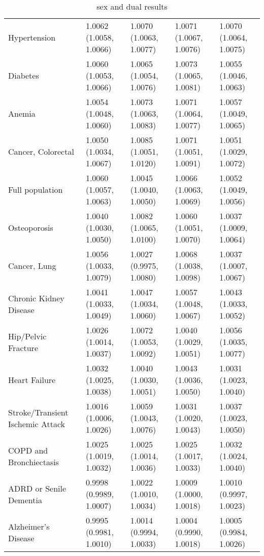 \begin{table}[ht]
\begin{tabular}{lllll}
  Hypertension & 1.0062 (1.0058, 1.0066) & 1.0070 (1.0063, 1.0077) & 1.0071 (1.0067, 1.0076) & 1.0070 (1.0064, 1.0075) \\ 
  Diabetes & 1.0060 (1.0053, 1.0066) & 1.0065 (1.0054, 1.0076) & 1.0073 (1.0065, 1.0081) & 1.0055 (1.0046, 1.0063) \\ 
  Anemia & 1.0054 (1.0048, 1.0060) & 1.0073 (1.0063, 1.0083) & 1.0071 (1.0064, 1.0077) & 1.0057 (1.0049, 1.0065) \\ 
  Cancer, Colorectal & 1.0050 (1.0034, 1.0067) & 1.0085 (1.0051, 1.0120) & 1.0071 (1.0051, 1.0091) & 1.0051 (1.0029, 1.0072) \\ 
  Full population & 1.0060 (1.0057, 1.0063) & 1.0045 (1.0040, 1.0050) & 1.0066 (1.0063, 1.0069) & 1.0052 (1.0049, 1.0056) \\ 
  Osteoporosis & 1.0040 (1.0030, 1.0050) & 1.0082 (1.0065, 1.0100) & 1.0060 (1.0051, 1.0070) & 1.0037 (1.0009, 1.0064) \\ 
  Cancer, Lung & 1.0056 (1.0033, 1.0079) & 1.0027 (0.9975, 1.0080) & 1.0068 (1.0038, 1.0098) & 1.0037 (1.0007, 1.0067) \\ 
  Chronic Kidney Disease & 1.0041 (1.0033, 1.0049) & 1.0047 (1.0034, 1.0060) & 1.0057 (1.0048, 1.0067) & 1.0043 (1.0033, 1.0052) \\ 
  Hip/Pelvic Fracture & 1.0026 (1.0014, 1.0037) & 1.0072 (1.0053, 1.0092) & 1.0040 (1.0029, 1.0051) & 1.0056 (1.0035, 1.0077) \\ 
  Heart Failure & 1.0032 (1.0025, 1.0038) & 1.0040 (1.0030, 1.0051) & 1.0043 (1.0036, 1.0050) & 1.0031 (1.0023, 1.0040) \\ 
  Stroke/Transient Ischemic Attack & 1.0016 (1.0006, 1.0026) & 1.0059 (1.0043, 1.0076) & 1.0031 (1.0020, 1.0043) & 1.0037 (1.0023, 1.0050) \\ 
  COPD and Bronchiectasis & 1.0025 (1.0019, 1.0032) & 1.0025 (1.0014, 1.0036) & 1.0025 (1.0017, 1.0033) & 1.0032 (1.0024, 1.0040) \\ 
  ADRD or Senile Dementia & 0.9998 (0.9989, 1.0007) & 1.0022 (1.0010, 1.0034) & 1.0009 (1.0000, 1.0018) & 1.0010 (0.9997, 1.0023) \\ 
  Alzheimer's Disease & 0.9995 (0.9981, 1.0010) & 1.0014 (0.9994, 1.0033) & 1.0004 (0.9990, 1.0018) & 1.0005 (0.9984, 1.0026) \\ 
   \hline
\end{tabular}
\caption{sex and dual results} 
\label{tab:stratified_OR_table}
\end{table}
